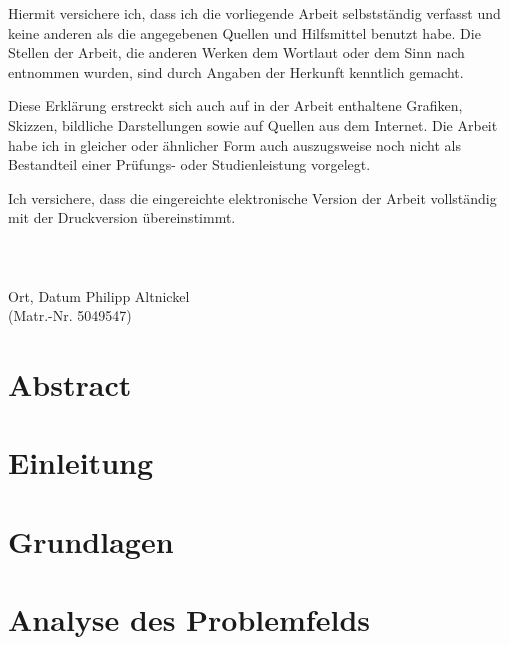 \vfill\documentclass[12pt]{extarticle}
\begin{document}
Hiermit versichere ich, dass ich die vorliegende Arbeit selbstständig verfasst und keine anderen als die angegebenen Quellen und Hilfsmittel benutzt habe. Die Stellen der Arbeit, die anderen Werken dem Wortlaut oder dem Sinn nach entnommen wurden, sind durch Angaben der Herkunft kenntlich gemacht.

Diese Erklärung erstreckt sich auch auf in der Arbeit enthaltene Grafiken, Skizzen, bildliche Darstellungen sowie auf Quellen aus dem Internet.
Die Arbeit habe ich in gleicher oder ähnlicher Form auch auszugsweise noch nicht als Bestandteil einer Prüfungs- oder Studienleistung vorgelegt. 

Ich versichere, dass die eingereichte elektronische Version der Arbeit vollständig mit der Druckversion übereinstimmt.
\\ \\ \\

\makebox[6cm]{\hrulefill}\hfill\makebox[6cm]{\hrulefill}\\
Ort, Datum \hfill Philipp Altnickel\\
\mbox{}\hfill(Matr.-Nr. 5049547)



\newpage
{}
\section*{Abstract}



\newpage
\tableofcontents

\newpage
\pagestyle{fancy}

\section{Einleitung}





\newpage
\section{Grundlagen}


\newpage
\section{Analyse des Problemfelds}
\label{sec:analyse}
\end{document}
